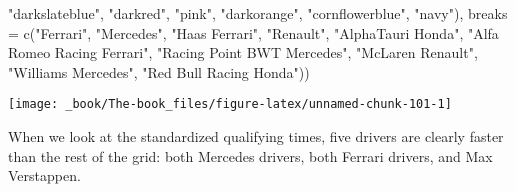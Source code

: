 \documentclass[
]{book}
\newenvironment{Shaded}{\begin{snugshade}}{\end{snugshade}}
\newcommand{\AttributeTok}[1]{\textcolor[rgb]{0.77,0.63,0.00}{#1}}
\newcommand{\FunctionTok}[1]{\textcolor[rgb]{0.00,0.00,0.00}{#1}}
\newcommand{\NormalTok}[1]{#1}
\newcommand{\StringTok}[1]{\textcolor[rgb]{0.31,0.60,0.02}{#1}}
\begin{document}
\begin{Shaded}
\begin{Highlighting}[]
                               \StringTok{"darkslateblue"}\NormalTok{, }
                                \StringTok{"darkred"}\NormalTok{,  }
                                \StringTok{"pink"}\NormalTok{, }
                                \StringTok{"darkorange"}\NormalTok{, }
                                \StringTok{"cornflowerblue"}\NormalTok{,}
                               \StringTok{"navy"}\NormalTok{),}
                     \AttributeTok{breaks =} \FunctionTok{c}\NormalTok{(}\StringTok{"Ferrari"}\NormalTok{,}
                                 \StringTok{"Mercedes"}\NormalTok{,}
                                 \StringTok{"Haas Ferrari"}\NormalTok{,}
                                 \StringTok{"Renault"}\NormalTok{,}
                                 \StringTok{"AlphaTauri Honda"}\NormalTok{,}
                                 \StringTok{"Alfa Romeo Racing Ferrari"}\NormalTok{, }
                                 \StringTok{"Racing Point BWT Mercedes"}\NormalTok{,}
                                 \StringTok{"McLaren Renault"}\NormalTok{,}
                                 \StringTok{"Williams Mercedes"}\NormalTok{,}
                                 \StringTok{"Red Bull Racing Honda"}\NormalTok{))}
\end{Highlighting}
\end{Shaded}

\begin{center}\texttt{[image: \_book/The-book\_files/figure-latex/unnamed-chunk-101-1]} \end{center}

When we look at the standardized qualifying times, five drivers are clearly faster than the rest of the grid: both Mercedes drivers, both Ferrari drivers, and Max Verstappen.
\end{document}
